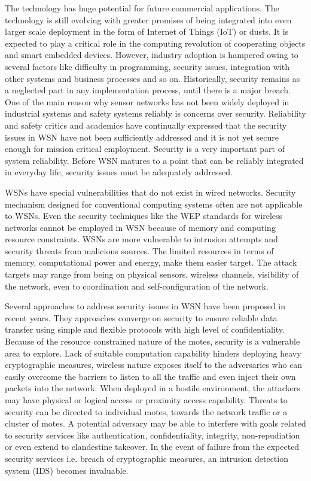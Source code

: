 \documentclass[conference,final]{IEEEtran}
\begin{document}
The technology has huge potential for future commercial applications. 
The technology is still evolving with greater promises of being integrated into even larger scale deployment in the form of Internet of Things (IoT) or dusts.
It is expected to play a critical role in the  computing revolution of cooperating objects and smart embedded devices. 
However, industry adoption is hampered owing to several factors like difficulty in programming, security issues, integration with other systems and business processes and so on. 
Historically, security remains as a neglected part in any implementation process, until there is a major breach. 
One of the main reason why sensor networks has not been widely deployed in industrial systems and safety systems reliably is concerns over security.
Reliability and safety critics and academics have continually expressed that  the security issues in WSN have not been sufficiently addressed and it is not yet secure enough for mission critical employment.
Security is a very important part of system reliability.
Before WSN matures to a point that can be reliably integrated in everyday life, security issues must be adequately addressed. 



WSNs have special vulnerabilities that do not exist in wired networks.
Security mechanism designed for conventional computing systems often are not applicable to  WSNs.
Even the security techniques like the WEP standards for wireless networks cannot be employed in WSN because of memory and computing resource constraints.
WSNs are more vulnerable to intrusion attempts and security threats from malicious sources.
The limited resources in terms of memory, computational power and energy, make them easier target. 
The attack targets may range from being on physical sensors, wireless channels, visibility of the network, even  to coordination and self-configuration of the network.

Several approaches to address security issues in WSN have been proposed in recent years. 
They approaches converge on security to ensure reliable data transfer using simple and flexible protocols with high level of confidentiality. 
Because of the resource constrained nature of the motes, security is a vulnerable area to explore.
Lack of suitable computation capability hinders deploying heavy cryptographic measures, wireless nature exposes itself to the adversaries who can easily overcome the barriers to listen to all the traffic and even inject their own packets into the network.
When deployed in a hostile environment, the attackers may have physical or logical access or proximity access capability. 
Threats to security  can be directed to individual motes, towards the network traffic or  a cluster of motes.
A potential adversary may be able to interfere with goals related to security services like authentication, confidentiality, integrity, non-repudiation or even extend to clandestine takeover.
In the event of failure from the expected security services i.e. breach of cryptographic measures, an intrusion detection system (IDS) becomes invaluable.
\end{document}
